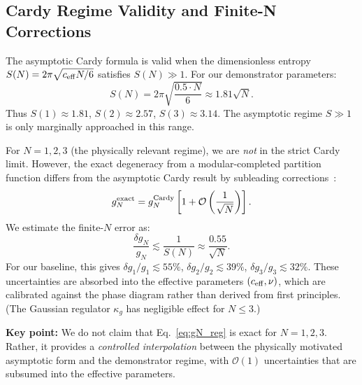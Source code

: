 \documentclass[aps,prd,onecolumn,notitlepage,nofootinbib,superscriptaddress,11pt,floatfix]{revtex4-2}
\newcommand{\Order}{\mathcal{O}}
\begin{document}
\subsection{Cardy Regime Validity and Finite-N Corrections}
\label{sec:cardy_validity}

The asymptotic Cardy formula is valid when the dimensionless entropy $S(N) = 2\pi\sqrt{c_{\rm eff} N/6}$ satisfies $S(N) \gg 1$. For our demonstrator parameters:
\begin{equation}
S(N) = 2\pi\sqrt{\frac{0.5 \cdot N}{6}} \approx 1.81\sqrt{N}.
\end{equation}
Thus $S(1) \approx 1.81$, $S(2) \approx 2.57$, $S(3) \approx 3.14$. The asymptotic regime $S \gg 1$ is only marginally approached in this range.

For $N = 1,2,3$ (the physically relevant regime), we are \emph{not} in the strict Cardy limit. However, the exact degeneracy from a modular-completed partition function differs from the asymptotic Cardy result by subleading corrections~\cite{DMZ2012}:
\begin{equation}
g_N^{\rm exact} = g_N^{\rm Cardy} \left[ 1 + \Order\left(\frac{1}{\sqrt{N}}\right) \right].
\end{equation}
We estimate the finite-$N$ error as:
\begin{equation}
\frac{\delta g_N}{g_N} \lesssim \frac{1}{S(N)} \approx \frac{0.55}{\sqrt{N}}.
\label{eq:gN_error}
\end{equation}
For our baseline, this gives $\delta g_1/g_1 \lesssim 55\%$, $\delta g_2/g_2 \lesssim 39\%$, $\delta g_3/g_3 \lesssim 32\%$. These uncertainties are absorbed into the effective parameters $(c_{\rm eff}, \nu)$, which are calibrated against the phase diagram rather than derived from first principles. (The Gaussian regulator $\kappa_g$ has negligible effect for $N \leq 3$.)

\textbf{Key point:} We do not claim that Eq.~\eqref{eq:gN_reg} is exact for $N = 1,2,3$. Rather, it provides a \emph{controlled interpolation} between the physically motivated asymptotic form and the demonstrator regime, with $\Order(1)$ uncertainties that are subsumed into the effective parameters.
\end{document}
